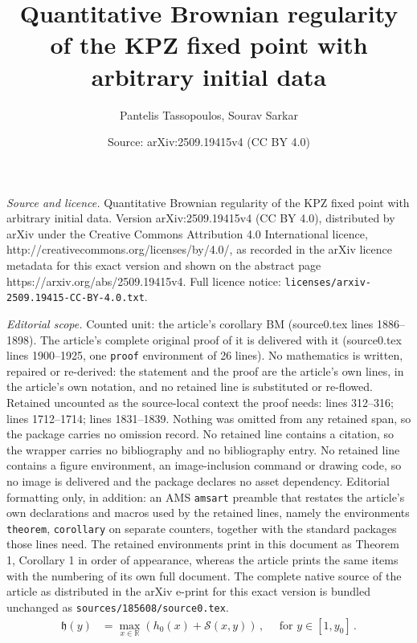 \documentclass[10pt,a4paper]{amsart}
\title{Quantitative Brownian regularity of the KPZ fixed point with arbitrary initial data}
\author{Pantelis Tassopoulos, Sourav Sarkar}
\date{Source: arXiv:2509.19415v4 (CC BY 4.0)}
\newcommand{\R}{\ensuremath{\mathbb{R}}}
\begin{document}
\maketitle

\noindent\emph{Source and licence.} Quantitative Brownian regularity of the KPZ fixed point with arbitrary initial data. Version arXiv:2509.19415v4 (CC BY 4.0), distributed by arXiv under the Creative Commons Attribution 4.0 International licence, http://creativecommons.org/licenses/by/4.0/, as recorded in the arXiv licence metadata for this exact version and shown on the abstract page https://arxiv.org/abs/2509.19415v4. Full licence notice: \texttt{licenses/arxiv-2509.19415-CC-BY-4.0.txt}.\par\smallskip

\noindent\textit{Editorial scope.} Counted unit: the article's corollary BM (source0.tex lines 1886--1898). The article's complete original proof of it is delivered with it (source0.tex lines 1900--1925, one \texttt{proof} environment of 26 lines). No mathematics is written, repaired or re-derived: the statement and the proof are the article's own lines, in the article's own notation, and no retained line is substituted or re-flowed.  Retained uncounted as the source-local context the proof needs: lines 312--316; lines 1712--1714; lines 1831--1839.  Nothing was omitted from any retained span, so the package carries no omission record.  No retained line contains a citation, so the wrapper carries no bibliography and no bibliography entry.  No retained line contains a figure environment, an image-inclusion command or drawing code, so no image is delivered and the package declares no asset dependency.  Editorial formatting only, in addition: an AMS \texttt{amsart} preamble that restates the article's own declarations and macros used by the retained lines, namely the environments \texttt{theorem}, \texttt{corollary} on separate counters, together with the standard packages those lines need.  The retained environments print in this document as Theorem 1, Corollary 1 in order of appearance, whereas the article prints the same items with the numbering of its own full document.  The complete native source of the article as distributed in the arXiv e-print for this exact version is bundled unchanged as \texttt{sources/185608/source0.tex}.
\begin{equation}\label{eq: KPZ fixed point}
\begin{array}{ll}
    \mathfrak{h}(y) &= \displaystyle\max_{x\in \R}(h_0(x)+\mathcal{S}(x,y))\,,  \quad \text{ for } y\in [1,y_0] \,.
\end{array}
\end{equation}
\end{document}
